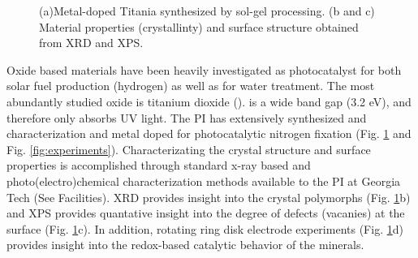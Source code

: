 \begin{figure}
\centering
\vspace{-1mm}
\caption{(a)Metal-doped Titania synthesized by sol-gel processing. (b and c) Material properties (crystallinty) and surface structure obtained from XRD and XPS.}
\label{fig:material}
\vspace{-2mm}
\end{figure}Oxide based materials have been heavily investigated as photocatalyst for both solar fuel production (hydrogen) as well as for water treatment\cite{tran_2012,lee_2016,nakata_2012}. The most abundantly studied oxide is titanium dioxide (\TIO). \TIO\hspace{2mm} is a wide band gap (3.2 eV), and therefore only absorbs UV light.  The PI has extensively synthesized and characterization \TIO\hspace{1mm} and metal doped \TIO\hspace{1mm} for photocatalytic nitrogen fixation (Fig. \ref{fig:material} and Fig. \ref{fig:experiments}). Characterizating the crystal structure and surface properties is accomplished through standard x-ray based and photo(electro)chemical characterization methods available to the PI at Georgia Tech (See Facilities). XRD provides insight into the crystal polymorphs (Fig. \ref{fig:material}b) and XPS provides quantative insight into the degree of defects (vacanies) at the surface (Fig. \ref{fig:material}c). In addition, rotating ring disk electrode experiments (Fig. \ref{fig:material}d) provides insight into the redox-based catalytic behavior of the minerals. 


